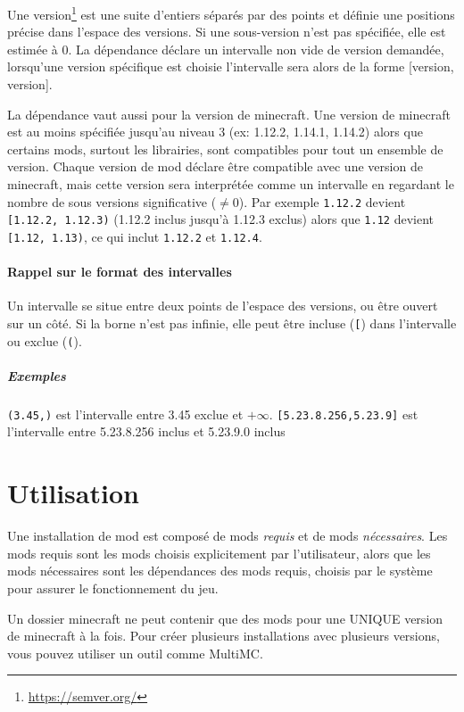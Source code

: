 \documentclass{article}
\begin{document}
Une version\footnote{\url{https://semver.org/}} est une suite d'entiers séparés par des points et définie une positions précise dans l'espace des versions.
Si une sous-version n'est pas spécifiée, elle est estimée à 0.
La dépendance déclare un intervalle non vide de version demandée, lorsqu'une version spécifique est choisie l'intervalle sera alors de la forme [version, version].

La dépendance vaut aussi pour la version de minecraft.
Une version de minecraft est au moins spécifiée jusqu'au niveau 3 (ex: 1.12.2, 1.14.1, 1.14.2) alors que certains mods, surtout les librairies, sont compatibles pour tout un ensemble de version.
Chaque version de mod déclare être compatible avec une version de minecraft, mais cette version sera interprétée comme un intervalle en regardant le nombre de sous versions significative ($\neq 0$).
Par exemple \verb|1.12.2| devient \verb|[1.12.2, 1.12.3)| (1.12.2 inclus jusqu'à 1.12.3 exclus) alors que \verb|1.12| devient \verb|[1.12, 1.13)|, ce qui inclut \verb|1.12.2| et \verb|1.12.4|.

\paragraph{Rappel sur le format des intervalles}
Un intervalle se situe entre deux points de l'espace des versions, ou être ouvert sur un côté.
Si la borne n'est pas infinie, elle peut être incluse (\verb|[|) dans l'intervalle ou exclue (\verb|(|).
\subparagraph{Exemples}
\verb|(3.45,)| est l'intervalle entre 3.45 exclue et $+\infty$.
\verb|[5.23.8.256,5.23.9]| est l'intervalle entre 5.23.8.256 inclus et 5.23.9.0 inclus

%
%
\section{Utilisation}
\label{section:utilisation}
Une installation de mod est composé de mods \textit{requis} et de mods \textit{nécessaires}.
Les mods requis sont les mods choisis explicitement par l'utilisateur, alors que les mods nécessaires sont les dépendances des mods requis, choisis par le système pour assurer le fonctionnement du jeu.

Un dossier minecraft ne peut contenir que des mods pour une UNIQUE version de minecraft à la fois.
Pour créer plusieurs installations avec plusieurs versions, vous pouvez utiliser un outil comme MultiMC. %
\end{document}
